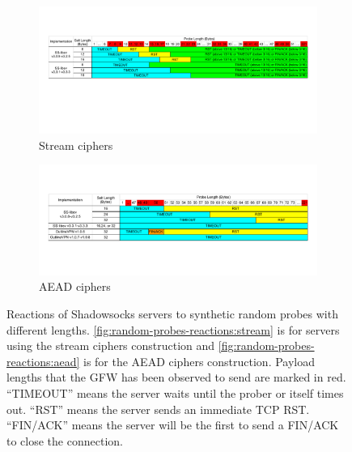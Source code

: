 \documentclass[sigconf,letterpaper]{acmart}
\begin{document}

\begin{figure}
    \begin{subfigure}[b]{\textwidth}
    \includegraphics[trim={0cm 3.5cm 0cm 1.9cm},clip]{./figures/reaction_to_random_probes_stream_cipher.pdf}
    \caption{Stream ciphers}
    \label{fig:random-probes-reactions:stream}
    \end{subfigure}

    \begin{subfigure}[b]{\textwidth}
    \includegraphics[trim={0cm 2.2cm 0cm 1.8cm},clip,width=\columnwidth]{./figures/reaction_to_random_probes_aead_cipher.pdf}
    \caption{AEAD ciphers}
    \label{fig:random-probes-reactions:aead}
    \end{subfigure}

    \caption{
    Reactions of Shadowsocks servers to synthetic random probes with different lengths.
    \autoref{fig:random-probes-reactions:stream} is for servers using the stream ciphers construction and
    \autoref{fig:random-probes-reactions:aead} is for the AEAD ciphers construction.
    Payload lengths that the GFW has been observed to send are marked in red.
    ``TIMEOUT'' means the server waits until the prober or itself times out.
    ``RST'' means the server sends an immediate TCP RST.
    ``FIN/ACK'' means the server will be the first to send a FIN/ACK to close the connection.
    }
    \label{fig:random-probes-reactions}
\end{figure}
\end{document}
